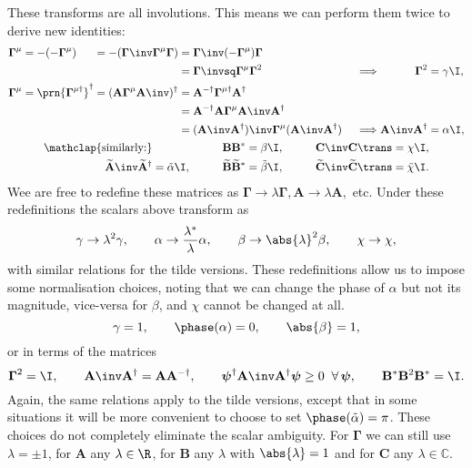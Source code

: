 \documentclass[11pt]{article}
\newcommand{\invd}{^{-\dag}}
\newcommand{\Gammab}{\boldsymbol{\Gamma}}
\newcommand{\Gammap}[1][\mu]{\prn{\Gammab^{#1}}}
\newcommand{\mud}{{\mu\dag}}
\newcommand{\A}{\mathbf{A}}
\newcommand{\B}{\mathbf{B}}
\renewcommand{\C}{\mathbf{C}}
\newcommand{\At}{\widetilde{\mathbf{A}}}
\newcommand{\Bt}{\widetilde{\mathbf{B}}}
\newcommand{\Ct}{\widetilde{\mathbf{C}}}
\newcommand{\Cb}{\mathbb{C}}
\newcommand{\psib}{\boldsymbol{\psi}}
\newcommand{\alphat}{\tilde{\alpha}}
\newcommand{\betat}{\tilde{\beta}}
\newcommand{\chit}{\tilde{\chi}}
\begin{document}
These transforms are all involutions.
This means we can perform them twice to derive new identities:
%
\begin{equation*}
\begin{gathered}
\begin{alignedat}{5}
  \Gammab^\mu &= -(-\Gammab^\mu) &
        &= -(\Gammab\inv \Gammab^\mu \Gammab) &
        &= \Gammab\inv (-\Gammab^\mu) \Gammab \\ && &&
        &= \Gammab\invsq \Gammab^\mu \Gammab^2 &\quad
  &\implies &
  \Gammab^2 &= \gamma \I, \\
  \Gammab^\mu &= \Gammap[\mud]^\dag &
        &= (\A \Gammab^\mu \A\inv)^\dag &
        &= \A\invd \Gammab^\mud \A^\dag \\ && &&
        &= \A\invd \A \Gammab^\mu \A\inv \A^\dag \\ && &&
        &= (\A\inv \A^\dag)\inv \Gammab^\mu (\A\inv \A^\dag) &
  &\implies &
  \A\inv \A^\dag &= \alpha \I,
\end{alignedat} \\
\begin{aligned}
  \mathclap{\text{similarly:}} &&\qquad
  \B \B^\ast &= \beta \I, &\qquad
  \C\inv \C\trans &= \chi \I, \\
  \At\inv \At^\dag &= \alphat \I, &
  \Bt \Bt^\ast &= \betat \I, &
  \Ct\inv \Ct\trans &= \chit \I.
\end{aligned}
\end{gathered}
\end{equation*}
%
Wee are free to redefine these matrices as $\Gammab \rightarrow \lambda \Gammab, \A \rightarrow \lambda \A,$ etc.
Under these redefinitions the scalars above transform as
%
\begin{equation*}
  \gamma \rightarrow \lambda^2 \gamma, \qquad
  \alpha \rightarrow \frac{\lambda^\ast}{\lambda} \alpha, \qquad
  \beta \rightarrow \abs{\lambda}^2 \beta, \qquad
  \chi \rightarrow \chi,
\end{equation*}
%
with similar relations for the tilde versions.
These redefinitions allow us to impose some normalisation choices, noting that we can change the phase of $\alpha$ but not its magnitude, vice-versa for $\beta$, and $\chi$ cannot be changed at all.
%
\begin{equation}\label{eq:normscalar}
  \gamma = 1, \qquad
  \phase(\alpha) = 0, \qquad
  \abs{\beta} = 1,
\end{equation}
%
or in terms of the matrices
%
\begin{equation}\label{eq:normmats}
  \Gammab^2 = \I, \qquad
  \A\inv \A^\dag = \A \A\invd, \qquad
  \psib^\dag \A\inv \A^\dag \psib \geq 0 \;\; \forall \, \psib, \qquad
  \B^\ast \B^2 \B^\ast = \I.
\end{equation}
%
Again, the same relations apply to the tilde versions, except that in some situations it will be more convenient to choose to set \( \phase(\alphat) = \pi \).
These choices do not completely eliminate the scalar ambiguity.
For $\Gammab$ we can still use $\lambda = \pm 1$, for $\A$ any $\lambda \in \R$, for $\B$ any $\lambda$ with $\abs{\lambda} = 1$ and for $\C$ any $\lambda \in \Cb$.
\end{document}

